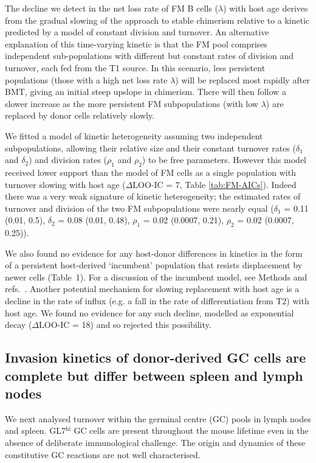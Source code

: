 \documentclass[11pt,onecolumn]{article}
\newcommand{\superscript}[1]{\ensuremath{^{\textrm{#1}}}} %
\newcommand{\red}[1]{{\color{red}{#1}}}
\newcommand{\looic}{\ensuremath{\Delta \text{LOO-IC}}}
\begin{document}
{	The decline we detect in the net loss rate of FM B cells ($\lambda$) with host age %
	derives from the gradual slowing of the approach to stable chimerism relative to a kinetic predicted by a  model of constant division and turnover. An alternative explanation of this time-varying kinetic is that the FM pool comprises independent sub-populations with different but constant rates of division and turnover, each fed from the T1 source.  In this scenario, less persistent populations (those with a high net loss rate $\lambda$) will be replaced most rapidly after BMT, giving an initial steep upslope in chimerism. There will then follow a slower increase as the more persistent FM subpopulations (with low $\lambda$) are replaced by donor cells relatively slowly.
	
	We fitted a model of kinetic heterogeneity assuming two independent subpopulations, allowing their relative size and their constant turnover rates ($\delta_{1}$ and $\delta_{2}$) and division rates ($\rho_{1}$ and $\rho_{2}$)  to be free parameters. However this model received lower support than the model of FM cells as a single population with turnover slowing with host age ({\looic} = 7, Table \ref{tab:FM-AICs}).   Indeed there was a very weak signature of kinetic heterogeneity;  the estimated rates of turnover and division of the two FM subpopulations were nearly equal  ($\delta_{1}$ = 0.11 (0.01, 0.5), $\delta_{2}$ = 0.08 (0.01, 0.48), $\rho_{1}$ = 0.02 (0.0007, 0.21), $\rho_{2}$ = 0.02 (0.0007, 0.25)). %
	
	We also found no evidence for any host-donor differences in kinetics in the form of a persistent host-derived `incumbent' population that resists displacement by newer cells (Table~1). For a discussion of the incumbent model, see Methods and refs.~.
	Another potential mechanism for slowing replacement with host age is a decline in the rate of influx (e.g. a fall in the rate of differentiation from T2) with host age.  We found no evidence for any such decline, modelled as exponential decay \red{Sanket is this what you did?} ({\looic} = 18) and so rejected this possibility.


}


\subsection*{Invasion kinetics of donor-derived GC cells are complete but differ between spleen and lymph nodes}
We next analysed turnover within the  germinal centre (GC) pools in lymph nodes and spleen. GL7\superscript{hi} GC cells are present throughout the mouse lifetime even in the absence of deliberate immunological challenge. The origin and dynamics of these constitutive GC reactions are not well characterised.
\end{document}

